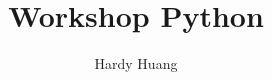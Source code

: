 \documentclass[a4paper,11pt]{report}
\author{Hardy Huang}
\title{Workshop Python}
\begin{document}
\renewcommand\contentsname{Daftar Isi}
\tableofcontents \clearpage

\renewcommand{\chaptername}{Modul}
\renewcommand{\figurename}{Gambar}









%
\end{document}
